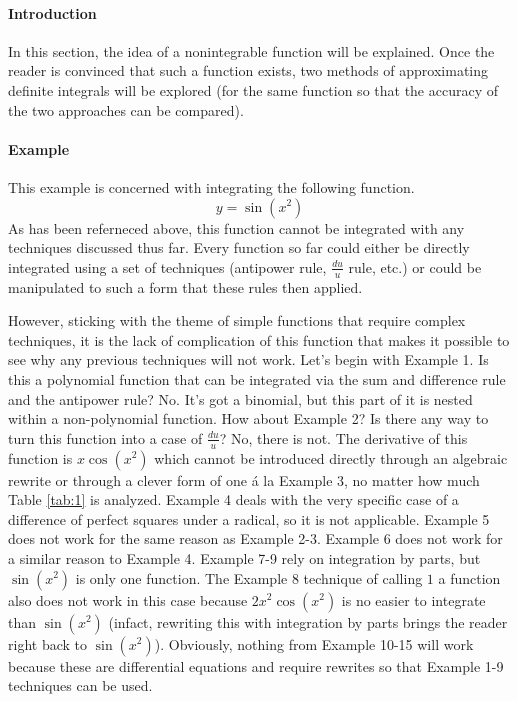 \documentclass{article}
\newcounter{example}%
\newcommand{\ex}{\stepcounter{example} \paragraph{Example \theexample}}
\begin{document}
\paragraph{Introduction} In this section, the idea of a nonintegrable function will be explained. Once the reader is convinced that such a function exists, two methods of approximating definite integrals will be explored (for the same function so that the accuracy of the two approaches can be compared).
\ex This example is concerned with integrating the following function.$$y=\sin(x^2)$$
As has been referneced above, this function cannot be integrated with any techniques discussed thus far. Every function so far could either be directly integrated using a set of techniques (antipower rule, $\frac{du}{u}$ rule, etc.) or could be manipulated to such a form that these rules then applied.\par
However, sticking with the theme of simple functions that require complex techniques, it is the lack of complication of this function that makes it possible to see why any previous techniques will not work. Let's begin with Example 1. Is this a polynomial function that can be integrated via the sum and difference rule and the antipower rule? No. It's got a binomial, but this part of it is nested within a non-polynomial function. How about Example 2? Is there any way to turn this function into a case of $\frac{du}{u}$? No, there is not. The derivative of this function is $x\cos(x^2)$ which cannot be introduced directly through an algebraic rewrite or through a clever form of one \'a la Example 3, no matter how much Table \ref{tab:1} is analyzed. Example 4 deals with the very specific case of a difference of perfect squares under a radical, so it is not applicable. Example 5 does not work for the same reason as Example 2-3. Example 6 does not work for a similar reason to Example 4. Example 7-9 rely on integration by parts, but $\sin(x^2)$ is only one function. The Example 8 technique of calling $1$ a function also does not work in this case because $2x^2\cos(x^2)$ is no easier to integrate than $\sin(x^2)$ (infact, rewriting this with integration by parts brings the reader right back to $\sin(x^2)$). Obviously, nothing from Example 10-15 will work because these are differential equations and require rewrites so that Example 1-9 techniques can be used.\par
\end{document}

